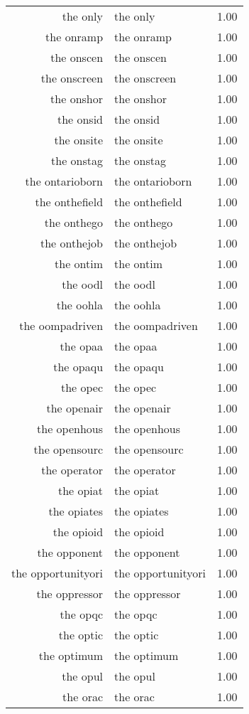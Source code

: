 \begin{table}[ht]
\begin{tabular}{rlr}
  the only & the only & 1.00 \\ 
  the onramp & the onramp & 1.00 \\ 
  the onscen & the onscen & 1.00 \\ 
  the onscreen & the onscreen & 1.00 \\ 
  the onshor & the onshor & 1.00 \\ 
  the onsid & the onsid & 1.00 \\ 
  the onsite & the onsite & 1.00 \\ 
  the onstag & the onstag & 1.00 \\ 
  the ontarioborn & the ontarioborn & 1.00 \\ 
  the onthefield & the onthefield & 1.00 \\ 
  the onthego & the onthego & 1.00 \\ 
  the onthejob & the onthejob & 1.00 \\ 
  the ontim & the ontim & 1.00 \\ 
  the oodl & the oodl & 1.00 \\ 
  the oohla & the oohla & 1.00 \\ 
  the oompadriven & the oompadriven & 1.00 \\ 
  the opaa & the opaa & 1.00 \\ 
  the opaqu & the opaqu & 1.00 \\ 
  the opec & the opec & 1.00 \\ 
  the openair & the openair & 1.00 \\ 
  the openhous & the openhous & 1.00 \\ 
  the opensourc & the opensourc & 1.00 \\ 
  the operator & the operator & 1.00 \\ 
  the opiat & the opiat & 1.00 \\ 
  the opiates & the opiates & 1.00 \\ 
  the opioid & the opioid & 1.00 \\ 
  the opponent & the opponent & 1.00 \\ 
  the opportunityori & the opportunityori & 1.00 \\ 
  the oppressor & the oppressor & 1.00 \\ 
  the opqc & the opqc & 1.00 \\ 
  the optic & the optic & 1.00 \\ 
  the optimum & the optimum & 1.00 \\ 
  the opul & the opul & 1.00 \\ 
  the orac & the orac & 1.00 \\ 

\end{tabular}
\end{table}
